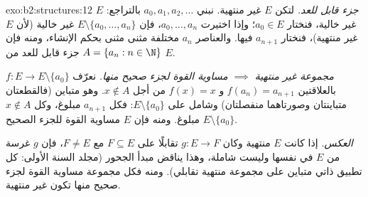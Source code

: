 \begin{solution}{exo:b2:structures:12}
\emph{جزء قابل للعد.} لتكن $E$ غير منتهية. نبني $a_0,
a_1, a_2, \dots$ بالتراجع: $E$ غير خالية، فنختار $a_0 \in E$؛
وإذا اختيرت $a_0, \dots, a_n$، فإن $E \setminus \{a_0, \dots,
a_n\}$ غير خالية (لأن $E$ غير منتهية)، فنختار $a_{n+1}$ فيها. والعناصر
$a_n$ مختلفة مثنى مثنى بحكم الإنشاء، ومنه فإن $A = \{a_n : n
\in \N\}$ جزء قابل للعد من $E$.

\emph{مجموعة غير منتهية $\implies$ مساوية القوة لجزء صحيح منها.} نعرّف
$f \colon E \to E \setminus \{a_0\}$ بالعلاقتين $f(a_n) = a_{n+1}$ و
$f(x) = x$ من أجل $x \notin A$. وهو متباين (فالقطعتان
متباينتان وصورتاهما منفصلتان) وشامل على $E \setminus
\{a_0\}$: فكل $a_{n+1}$ مبلوغ، وكل $x \notin A$ مبلوغ. ومنه فإن
$E$ مساوية القوة للجزء الصحيح $E \setminus \{a_0\}$.

\emph{العكس.} إذا كانت $E$ منتهية وكان $g \colon E \to F$ تقابلًا
على $F \subseteq E$ مع $F \neq E$، فإن $g$ غرسة
من $E$ في نفسها وليست شاملة،
وهذا يناقض مبدأ الجحور (مجلد السنة الأولى: كل تطبيق ذاتي
متباين على مجموعة منتهية تقابلي). ومنه فكل مجموعة
مساوية القوة لجزء صحيح منها تكون غير منتهية.
\end{solution}

